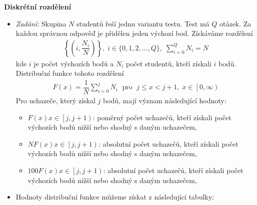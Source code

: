 \begin{mdframed}[style=mdexam]
\begin{example}
    {\centering
    \captionsetup{type=figure}
    \par}
    
    \textbf{Diskrétní rozdělení}
      \begin{itemize}
        \item \emph{Zadání:} Skupina \(N\) studentů řeší jednu variantu testu. Test má \(Q\) otázek.
              Za každou správnou odpověď je přidělen jeden výchozí bod. Získáváme rozdělení
              \begin{gather*}
                \left\lbrace\left(i, \dfrac{N_i}{N} \right)\right\rbrace, \;
                i\in\lbrace0, 1, 2, \ldots, Q\rbrace, \;
                \sum_{i=0}^{Q}N_i = N 
              \end{gather*}
              kde \(i\) je počet výchozích bodů a \(N_i\) počet studentů, kteří získali \(i\) bodů.
              Distribuční funkce tohoto rozdělení
              \begin{gather*}
                F(x) = \dfrac{1}{N}\sum_{i=0}^{j}N_i\;\text{ pro }\;
                j\leq x < j+1, \; x\in\left[0,\infty\right)
              \end{gather*}
              Pro uchazeče, který získal \(j\) bodů, mají význam následující hodnoty:
              \begin{itemize}
                \item \(F(x)    x \in \left[j, j+1\right)\): poměrný počet uchazečů, kteří získali
                      počet výchozích bodů nižší nebo shodný s daným uchazečem,
                \item \(NF(x)   x \in \left[j, j+1\right)\): absolutní počet uchazečů, kteří získali
                      počet výchozích bodů nižší nebo shodný s daným uchazečem,
                \item \(100F(x) x \in \left[j, j+1\right)\): absolutní počet uchazečů, kteří získali
                      počet výchozích bodů nižší nebo shodný s daným uchazečem,
              \end{itemize}
        \item Hodnoty distribuční funkce můžeme získat z následující tabulky:
        

\end{itemize}
\end{example}
\end{mdframed}
